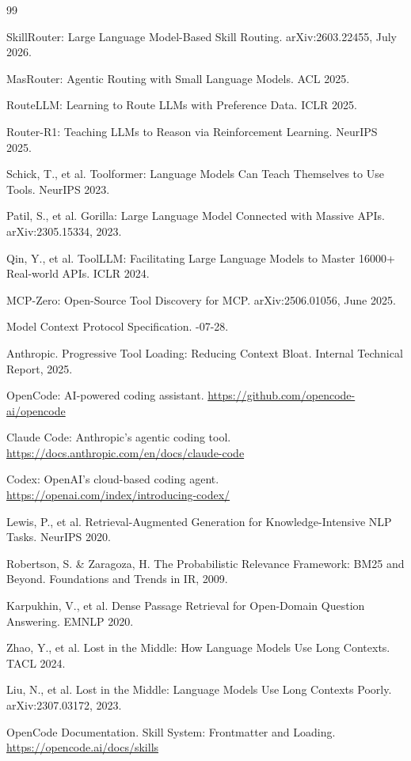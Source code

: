 \documentclass[11pt]{article}
\begin{document}

\begin{thebibliography}{99}

SkillRouter: Large Language Model-Based Skill Routing.
\newblock arXiv:2603.22455, July 2026.

MasRouter: Agentic Routing with Small Language Models.
\newblock ACL 2025.

RouteLLM: Learning to Route LLMs with Preference Data.
\newblock ICLR 2025.

Router-R1: Teaching LLMs to Reason via Reinforcement Learning.
\newblock NeurIPS 2025.

Schick, T., et al. Toolformer: Language Models Can Teach Themselves to Use Tools.
\newblock NeurIPS 2023.

Patil, S., et al. Gorilla: Large Language Model Connected with Massive APIs.
\newblock arXiv:2305.15334, 2023.

Qin, Y., et al. ToolLLM: Facilitating Large Language Models to Master 16000+ Real-world APIs.
\newblock ICLR 2024.

MCP-Zero: Open-Source Tool Discovery for MCP.
\newblock arXiv:2506.01056, June 2025.

Model Context Protocol Specification.
-07-28.

Anthropic. Progressive Tool Loading: Reducing Context Bloat.
\newblock Internal Technical Report, 2025.

OpenCode: AI-powered coding assistant.
\newblock \url{https://github.com/opencode-ai/opencode}

Claude Code: Anthropic's agentic coding tool.
\newblock \url{https://docs.anthropic.com/en/docs/claude-code}

Codex: OpenAI's cloud-based coding agent.
\newblock \url{https://openai.com/index/introducing-codex/}

Lewis, P., et al. Retrieval-Augmented Generation for Knowledge-Intensive NLP Tasks.
\newblock NeurIPS 2020.

Robertson, S. \& Zaragoza, H. The Probabilistic Relevance Framework: BM25 and Beyond.
\newblock Foundations and Trends in IR, 2009.

Karpukhin, V., et al. Dense Passage Retrieval for Open-Domain Question Answering.
\newblock EMNLP 2020.

Zhao, Y., et al. Lost in the Middle: How Language Models Use Long Contexts.
\newblock TACL 2024.

Liu, N., et al. Lost in the Middle: Language Models Use Long Contexts Poorly.
\newblock arXiv:2307.03172, 2023.

OpenCode Documentation. Skill System: Frontmatter and Loading.
\newblock \url{https://opencode.ai/docs/skills}

\end{thebibliography}
\end{document}
